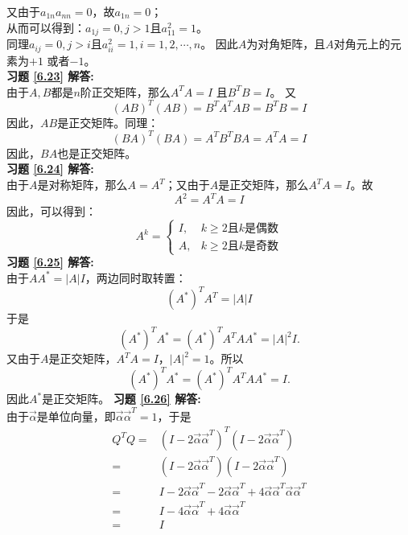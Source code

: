 又由于$a_{1n}a_{nn}=0$，故$a_{1n}=0$；\\
从而可以得到：$a_{1j}=0,j>1$且$a_{11}^2=1$。\\
同理$a_{ij}=0,j>i$且$a_{ii}^2=1,i=1,2,\cdots,n$。
因此$A$为对角矩阵，且$A$对角元上的元素为$+1$ 或者$-1$。\\
\textbf{习题 \ref{6.23} 解答:}\\
由于$A,B$都是$n$阶正交矩阵，那么$A^TA=I$ 且$B^TB=I$。
又
\begin{equation*}
  (AB)^T(AB)=B^TA^TAB=B^TB=I
\end{equation*}
因此，$AB$是正交矩阵。同理：
\begin{equation*}
  (BA)^T(BA)=A^TB^TBA=A^TA=I
\end{equation*}
因此，$BA$也是正交矩阵。\\
\textbf{习题 \ref{6.24} 解答:}\\
由于$A$是对称矩阵，那么$A=A^T$；又由于$A$是正交矩阵，那么$A^TA=I$。故
\begin{equation*}
A^2=A^TA=I
\end{equation*}
因此，可以得到：
\begin{equation*}
 A^{k}=\begin{cases}
  I,& k\geq2\text{且}k\text{是偶数}\\
  A,& k\geq2\text{且}k\text{是奇数}
  \end{cases}
\end{equation*}
\textbf{习题 \ref{6.25} 解答:}\\
由于$AA^*=|A|I$，两边同时取转置：
\begin{equation*}
(A^*)^TA^T=|A|I
\end{equation*}
于是
\begin{equation*}
(A^*)^TA^*=(A^*)^TA^TAA^*=|A|^2I.
\end{equation*}
又由于$A$是正交矩阵，$A^TA=I$，$|A|^2=1$。所以
\begin{equation*}
(A^*)^TA^*=(A^*)^TA^TAA^*=I.
\end{equation*}
因此$A^*$是正交矩阵。
\textbf{习题 \ref{6.26} 解答:}\\
由于$\vec{\alpha}$是单位向量，即$\vec{\alpha}\vec{\alpha}^T=1$，于是
\begin{align*}
Q^TQ=&(I-2\vec{\alpha}\vec{\alpha}^T)^T(I-2\vec{\alpha}\vec{\alpha}^T)\\
    =&(I-2\vec{\alpha}\vec{\alpha}^T)(I-2\vec{\alpha}\vec{\alpha}^T)\\
    =&I-2\vec{\alpha}\vec{\alpha}^T-2\vec{\alpha}\vec{\alpha}^T+4\vec{\alpha}\vec{\alpha}^T\vec{\alpha}\vec{\alpha}^T\\
    =&I-4\vec{\alpha}\vec{\alpha}^T+4\vec{\alpha}\vec{\alpha}^T\\
    =&I
\end{align*}
